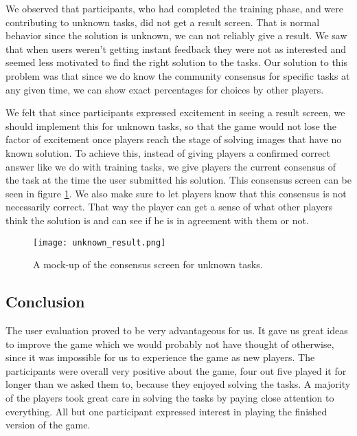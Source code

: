 We observed that participants, who had completed the training phase, and were contributing to unknown tasks, did not get a result screen. That is normal behavior since the solution is unknown, we can not reliably give a result. We saw that when users weren't getting instant feedback they were not as interested and seemed less motivated to find the right solution to the tasks. Our solution to this problem was that since we do know the community consensus for specific tasks at any given time, we can show exact percentages for choices by other players. 

We felt that since participants expressed excitement in seeing a result screen, we should implement this for unknown tasks, so that the game would not lose the factor of excitement once players reach the stage of solving images that have no known solution. To achieve this, instead of giving players a confirmed correct answer like we do with training tasks, we give players the current consensus of the task at the time the user submitted his solution. This consensus screen can be seen in figure \ref{fig:consensus}. We also make sure to let players know that this consensus is not necessarily correct. That way the player can get a sense of what other players think the solution is and can see if he is in agreement with them or not.

\begin{figure}[H]
	\centering
	\graphicspath{ {./graphics/} }
	\centerline{\texttt{[image: unknown\_result.png]}}
	\caption{\label{fig:consensus}A mock-up of the consensus screen for unknown tasks.}
\end{figure}

\subsection{Conclusion}
	The user evaluation proved to be very advantageous for us. It gave us great ideas to improve the game which we would probably not have thought of otherwise, since it was impossible for us to experience the game as new players. The participants were overall very positive about the game, four out five played it for longer than we asked them to, because they enjoyed solving the tasks. A majority of the players took great care in solving the tasks by paying close attention to everything. All but one participant expressed interest in playing the finished version of the game.

